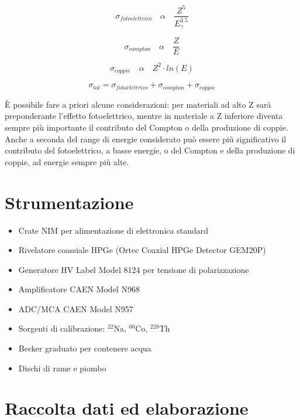 \documentclass[a4paper,10pt]{article}
\begin{document}
\begin{equation}
	\sigma_{fotoelettrico}\quad  \alpha \quad  \frac{Z^5}{E_{\gamma}^{3.5}}
\end{equation}

\begin{equation}
	\sigma_{compton}\quad  \alpha \quad  \frac{Z}{E}
\end{equation}

\begin{equation}
	\sigma_{coppie}\quad  \alpha \quad  Z^2 \cdot ln(E)
\end{equation}

\begin{equation}
	\sigma_{tot} = \sigma_{fotoelettrico} + \sigma_{compton} + \sigma_{coppie}
\end{equation}

\noindent \`E possibile fare a priori alcune considerazioni: per materiali ad alto Z sar\`a preponderante l'effetto fotoelettrico, mentre in materiale a Z inferiore diventa sempre pi\`u importante il contributo del Compton o della produzione di coppie. Anche a seconda del range di energie considerato pu\`o essere pi\`u significativo il contributo del fotoelettrico, a basse energie, o del Compton e della produzione di coppie, ad energie sempre pi\`u alte.


\section{Strumentazione}
\begin{itemize}
\item Crate NIM per alimentazione di elettronica standard
\item Rivelatore coassiale HPGe (Ortec Coaxial HPGe Detector GEM20P)
\item Generatore HV Label Model 8124 per tensione di polarizzazione
\item Amplificatore CAEN Model N968
\item ADC/MCA CAEN Model N957
\item Sorgenti di calibrazione: ${}^{22}$Na, ${}^{60}$Co, ${}^{228}$Th
\item Becker graduato per contenere acqua
\item Dischi di rame e piombo
\end{itemize}


\section{Raccolta dati ed elaborazione}
\end{document}
